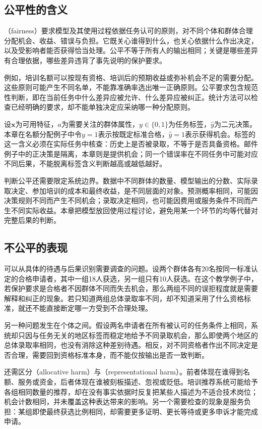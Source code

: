 \subsection{公平性的含义}
\label{sec:fairness-meaning}

（fairness）要求模型及其使用过程依据任务认可的原则，对不同个体和群体合理分配机会、收益、错误与负担。它既关心谁得到什么，也关心依据什么作出决定，以及受影响者能否获得恰当处理。公平不等于所有人的输出相同；关键是哪些差异有合理依据，哪些差异违背了事先说明的保护要求。

例如，培训名额可以按现有资格、培训后的预期收益或弥补机会不足的需要分配。这些原则可能产生不同名单，不能靠准确率选出唯一正确原则。公平要求包含规范性判断，即在当前任务中什么差异应被允许、什么差异应被纠正。统计方法可以检查已经明确的要求，却不能单独决定应采纳哪一种分配原则。

设$\bm{x}$为可用特征，$a$为需要关注的群体属性，$y\in\{0,1\}$为任务标签，$\hat y$为二元决策。本章在名额分配例子中令$y=1$表示按既定标准合格，$\hat y=1$表示获得机会。标签的这一含义必须在实际任务中核查：历史上是否被录取，不等于是否具备资格。邮件例子中的正决策是隔离，本章则是提供机会；同一个错误率在不同任务中可能对应不同后果，不能脱离标签含义判断越高或越低越好。

判断公平还需要限定系统边界。数据中不同群体的数量、模型输出的分数、实际录取决定、参加培训的成本和最终收益，是不同层面的对象。预测概率相同，可能因决策规则不同而产生不同机会；录取决定相同，也可能因费用或服务条件不同而产生不同实际收益。本章把模型放回使用过程讨论，避免用某一个环节的均等代替对完整后果的判断。

\subsection{不公平的表现}
\label{sec:fairness-manifestations}

可以从具体的待遇与后果识别需要调查的问题。设两个群体各有20名按同一标准认定的合格申请者，其中一组18人获选，另一组只有10人获选。在这个教学例子中，若保护要求是合格者不因群体不同而失去机会，那么两组不同的误拒程度就是需要解释和纠正的现象。若只知道两组总体录取率不同，却不知道采用了什么资格标准，就还不能直接断定哪一方受到不合理处理。

另一种问题发生在个体之间。假设两名申请者在所有被认可的任务条件上相同，系统却只因与任务无关的地区标签而稳定地给予不同录取机会，那么即使两个地区的总体录取率相同，也没有消除这种差别待遇。相反，对不同资格者作出不同决定是否合理，需要回到资格标准本身，而不能仅按输出是否一致判断。

还需区分（allocative harm）与（representational harm）。前者体现在谁得到名额、服务或资金，后者体现在谁被刻板描述、忽视或贬低。培训推荐系统可能给予各组相同数量的推荐，却在没有事实依据时反复把某些人描述为不适合技术岗位；机会计数相同，并未覆盖这种表达带来的影响。另一个需要检查的现象是服务负担：某组即使最终获选比例相同，却需要更多证明、更长等待或更多申诉才能完成申请。


